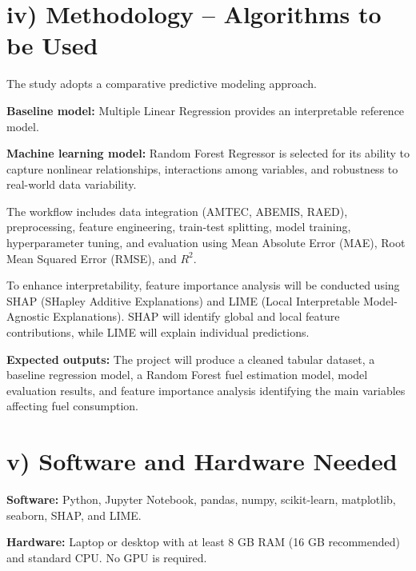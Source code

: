 \documentclass[10pt,twocolumn]{article}
\begin{document}
\vspace{10pt}

\section*{\small iv) Methodology -- Algorithms to be Used}

The study adopts a comparative predictive modeling approach.

\vspace{10pt}

\textbf{\small Baseline model:} Multiple Linear Regression provides an interpretable reference model.

\vspace{10pt}

\textbf{\small Machine learning model:} Random Forest Regressor is selected for its ability to capture nonlinear relationships, interactions among variables, and robustness to real-world data variability.

\vspace{10pt}

The workflow includes data integration (AMTEC, ABEMIS, RAED), preprocessing, feature engineering, train-test splitting, model training, hyperparameter tuning, and evaluation using Mean Absolute Error (MAE), Root Mean Squared Error (RMSE), and $R^2$.

\vspace{10pt}

To enhance interpretability, feature importance analysis will be conducted using SHAP (SHapley Additive Explanations) and LIME (Local Interpretable Model-Agnostic Explanations). SHAP will identify global and local feature contributions, while LIME will explain individual predictions.

\vspace{10pt}

\textbf{\small Expected outputs:} The project will produce a cleaned tabular dataset, a baseline regression model, a Random Forest fuel estimation model, model evaluation results, and feature importance analysis identifying the main variables affecting fuel consumption.

\vspace{10pt}

\section*{\small v) Software and Hardware Needed}

\textbf{Software:} Python, Jupyter Notebook, pandas, numpy, scikit-learn, matplotlib, seaborn, SHAP, and LIME.

\vspace{10pt}

\textbf{Hardware:} Laptop or desktop with at least 8 GB RAM (16 GB recommended) and standard CPU. No GPU is required.
\end{document}
